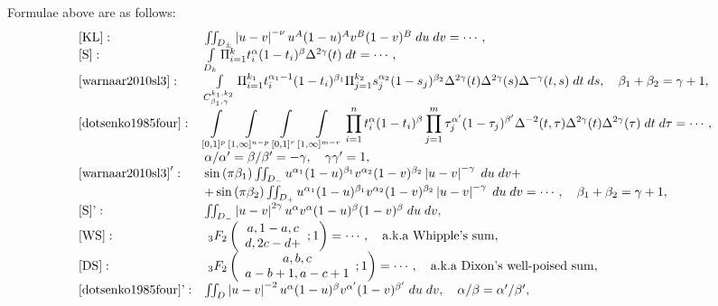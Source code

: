 \documentclass[a4paper,12pt]{article}
\begin{document}
Formulae above are as follows:\begin{equation*}
	\begin{array}[]{ll}
		\mbox{[KL]}:&\iint_{D_\pm}\myabs{u-v}^{-\nu}u^A(1-u)^Av^B(1-v)^B\;du\;dv=\cdots,\\
		\mbox{[S]}:&\int_{D_k}\Pi_{i=1}^kt_i^\alpha(1-t_i)^\beta\Delta^{2\gamma}(t)\;dt=\cdots,\\
		\mbox{\cite{warnaar2010sl3}}:&\int_{C_{\beta_1,\gamma}^{k_1,k_2}}\Pi_{i=1}^{k_1}t_i^{\alpha_1-1}(1-t_i)^{\beta_1}\Pi_{j=1}^{k_2}s_j^{\alpha_2}(1-s_j)^{\beta_2}
		\Delta^{2\gamma}(t)\Delta^{2\gamma}(s)\Delta^{-\gamma}(t,s)\;dt\;ds,\quad\beta_1+\beta_2=\gamma+1,\\
		\mbox{\cite{dotsenko1985four}}:&\displaystyle\int_{[0,1]^p}\int_{[1,\infty]^{n-p}}\int_{[0,1]^r}\int_{[1,\infty]^{m-r}}\prod_{i=1}^nt_i^\alpha(1-t_i)^\beta
		\prod_{j=1}^m\tau_j^{\alpha'}(1-\tau_j)^{\beta'}\Delta^{-2}(t,\tau)\Delta^{2\gamma}(t)\Delta^{2\gamma}(\tau)\;dt\;d\tau=\cdots,\\
		&{\alpha}/{\alpha'}={\beta}/{\beta'}=-\gamma,\quad\gamma\gamma'=1,\\
		\mbox{\cite{warnaar2010sl3}}':&\sin\mybra{\pi\beta_1}\iint_{D_-}u^{\alpha_1}(1-u)^{\beta_1}v^{\alpha_2}(1-v)^{\beta_2}\myabs{u-v}^{-\gamma}\;du\;dv+\\
		&+\sin\mybra{\pi\beta_2}\iint_{D_+}u^{\alpha_1}(1-u)^{\beta_1}v^{\alpha_2}(1-v)^{\beta_2}\myabs{u-v}^{-\gamma}\;du\;dv=\cdots,\quad \beta_1+\beta_2=\gamma+1,\\
		\mbox{[S]'}:&\iint_{D_-}\myabs{u-v}^{2\gamma}u^\alpha v^\alpha(1-u)^\beta(1-v)^\beta\;du\;dv,\\
		\mbox{[WS]}:&\;_3F_2\left(\begin{array}[]{c}
			a,1-a,c\\ d,2c-d+
		\end{array};1\right)=\cdots,\quad\mbox{a.k.a Whipple's sum},\\
		\mbox{[DS]}:&\;_3F_2\left(\begin{array}[]{c}
			a,b,c\\a-b+1,a-c+1
		\end{array};1\right)=\cdots,\quad\mbox{a.k.a Dixon's well-poised sum},\\
		\mbox{\cite{dotsenko1985four}'}:&\iint_D\myabs{u-v}^{-2}u^\alpha(1-u)^\beta v^{\alpha'}(1-v)^{\beta'}\;du\;dv,\quad \alpha/\beta=\alpha'/\beta',\\
	\end{array}
\end{equation*}
\end{document}
